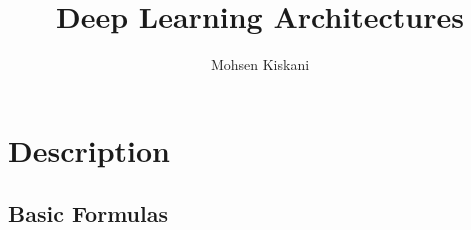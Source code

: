 \documentclass[10pt, etterpaper]{article}
\begin{document}
\title{Deep Learning Architectures}

\author{Mohsen Kiskani}

\maketitle


\section{Description}
\subsection{Basic Formulas}
\end{document}

